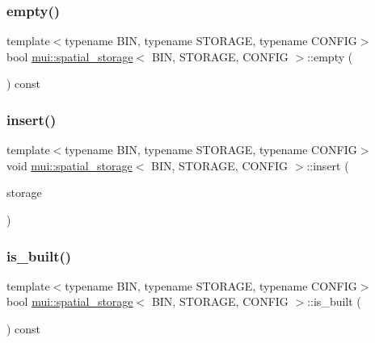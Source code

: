 \subsubsection{\texorpdfstring{empty()}{empty()}}
{\footnotesize\ttfamily template$<$typename B\+IN, typename S\+T\+O\+R\+A\+GE, typename C\+O\+N\+F\+IG$>$ \\
bool \hyperlink{classmui_1_1spatial__storage}{mui\+::spatial\+\_\+storage}$<$ B\+IN, S\+T\+O\+R\+A\+GE, C\+O\+N\+F\+IG $>$\+::empty (\begin{DoxyParamCaption}{ }\end{DoxyParamCaption}) const\hspace{0.3cm}{\ttfamily [inline]}}

\mbox{\label{classmui_1_1spatial__storage_aabb3121647617faf8da57ca266b9a7d0}} 
\subsubsection{\texorpdfstring{insert()}{insert()}}
{\footnotesize\ttfamily template$<$typename B\+IN, typename S\+T\+O\+R\+A\+GE, typename C\+O\+N\+F\+IG$>$ \\
void \hyperlink{classmui_1_1spatial__storage}{mui\+::spatial\+\_\+storage}$<$ B\+IN, S\+T\+O\+R\+A\+GE, C\+O\+N\+F\+IG $>$\+::insert (\begin{DoxyParamCaption}\item[{storage\+\_\+t}]{storage }\end{DoxyParamCaption})\hspace{0.3cm}{\ttfamily [inline]}}

\mbox{\label{classmui_1_1spatial__storage_a3daf69eb1e3d9b2aeeff81d29fbdc2d7}} 
\subsubsection{\texorpdfstring{is\+\_\+built()}{is\_built()}}
{\footnotesize\ttfamily template$<$typename B\+IN, typename S\+T\+O\+R\+A\+GE, typename C\+O\+N\+F\+IG$>$ \\
bool \hyperlink{classmui_1_1spatial__storage}{mui\+::spatial\+\_\+storage}$<$ B\+IN, S\+T\+O\+R\+A\+GE, C\+O\+N\+F\+IG $>$\+::is\+\_\+built (\begin{DoxyParamCaption}{ }\end{DoxyParamCaption}) const\hspace{0.3cm}{\ttfamily [inline]}}


